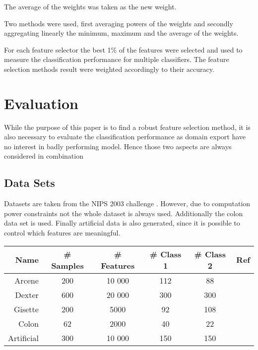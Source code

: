 \documentclass[twoside,11pt]{article}
\begin{document}
{\begin{description}[align=left]
\item [Linear aggregation :] The average of the weights was taken as the new weight.
\item [Non-linear aggregation :] Two methods were used, first averaging powers of the weights and secondly aggregating linearly the minimum, maximum and the average of the weights.
\item [Performance related aggregation :] For each feature selector the best 1\% of the features were selected and used to measure the classification performance for multiple classifiers. The feature selection methods result were weighted accordingly to their accuracy.
\end{description}

\section{Evaluation}

While the purpose of this paper is to find a robust feature selection method, it is also necessary to evaluate the classification performance as domain export have no interest in badly performing model. Hence those two aspects are always considered in combination

\subsection{Data Sets}
Datasets are taken from the NIPS 2003 challenge \cite{NIPS}. However, due to computation power constraints not the whole dataset is always used. Additionally the colon data set \cite{alon1999broad} is used. Finally artificial data is also generated, since it is possible to control which features are meaningful. 

\begin{center}
    \begin{tabular}{| r | c | c | c | c | c |}
    \hline
    Name & \# Samples & \# Features & \# Class 1 & \# Class 2 & Ref\\ \hline
    Arcene & 200 & 10 000 & 112 & 88 & \cite{NIPS} \\
    Dexter & 600 & 20 000 & 300 & 300 & \cite{NIPS} \\
    Gisette & 200 & 5000 & 92 & 108 & \cite{NIPS} \\
    Colon & 62 & 2000 & 40 & 22 &  \cite{alon1999broad} \\
    Artificial & 300 & 10 000 & 150 & 150 & \\
    \hline
    \end{tabular}
\end{center}

}
\end{document}
